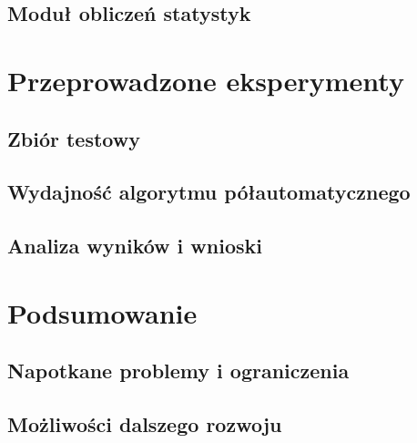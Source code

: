 \documentclass[a4paper,11pt,twoside]{report}
\theoremstyle{definition}
\begin{document}
\section {Moduł obliczeń statystyk}

\chapter {Przeprowadzone eksperymenty}

\section {Zbiór testowy}

\section {Wydajność algorytmu półautomatycznego}

\section {Analiza wyników i wnioski}


\chapter {Podsumowanie}

\section {Napotkane problemy i ograniczenia}

\section {Możliwości dalszego rozwoju}







\end{document}
